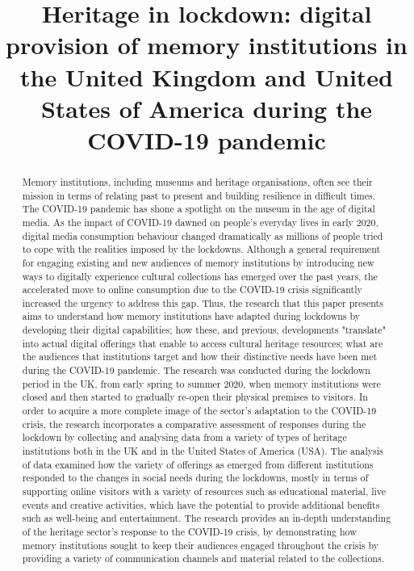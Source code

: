 \documentclass{egpubl}
\title[Heritage in lockdown: digital provision of memory institutions during the COVID-19 pandemic]%
      {Heritage in lockdown: digital provision of memory institutions in the United Kingdom and United States of America during the COVID-19 pandemic}
\begin{document}

\maketitle
\begin{abstract}
Memory institutions, including museums and heritage organisations, often see their mission in terms of relating past to present and building resilience in difficult times. The COVID-19 pandemic has shone a spotlight on the museum in the age of digital media. As the impact of COVID-19 dawned on people's everyday lives in early 2020, digital media consumption behaviour changed dramatically as millions of people tried to cope with the realities imposed by the lockdowns. Although a general requirement for engaging existing and new audiences of memory institutions by introducing new ways to digitally experience cultural collections has emerged over the past years, the accelerated move to online consumption due to the COVID-19 crisis significantly increased the urgency to address this gap. Thus, the research that this paper presents aims to understand how memory institutions have adapted during lockdowns by developing their digital capabilities; how these, and previous, developments "translate" into actual digital offerings that enable to access cultural heritage resources; what are the audiences that institutions target and how their distinctive needs have been met during the COVID-19 pandemic. The research  was conducted during the lockdown period in the UK, from early spring to summer 2020, when memory institutions were closed and then started to gradually re-open their physical premises to visitors. In order to acquire a more complete image of the sector's adaptation to the COVID-19 crisis, the research incorporates a comparative assessment of responses during the lockdown by collecting and analysing data from a variety of types of heritage institutions both in the UK and in the United States of America (USA). The analysis of data examined how the variety of offerings as emerged from different institutions responded to the changes in social needs during the lockdowns, mostly in terms of supporting online visitors with a variety of resources such as educational material, live events and creative activities, which have the potential to provide additional benefits such as well-being and entertainment. The research provides an in-depth understanding of the heritage sector's response to the COVID-19 crisis, by demonstrating how memory institutions sought to keep their audiences engaged throughout the crisis by providing a variety of communication channels and material related to the collections. 


\end{abstract}
\end{document}
